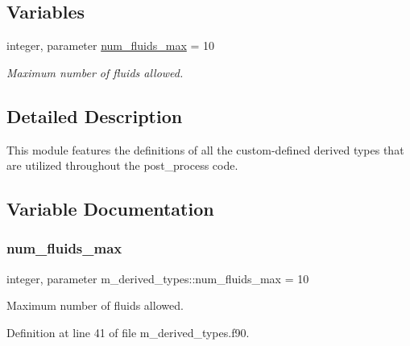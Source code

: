 \subsection*{Variables}
\begin{DoxyCompactItemize}
\item 
integer, parameter \hyperlink{namespacem__derived__types_a3dde07670ef3e164534aa68c1830ff62}{num\+\_\+fluids\+\_\+max} = 10
\begin{DoxyCompactList}\small\item\em Maximum number of fluids allowed. \end{DoxyCompactList}\end{DoxyCompactItemize}


\subsection{Detailed Description}
This module features the definitions of all the custom-\/defined derived types that are utilized throughout the post\+\_\+process code. 

\subsection{Variable Documentation}
\mbox{\label{namespacem__derived__types_a3dde07670ef3e164534aa68c1830ff62}} 
\subsubsection{\texorpdfstring{num\+\_\+fluids\+\_\+max}{num\_fluids\_max}}
{\footnotesize\ttfamily integer, parameter m\+\_\+derived\+\_\+types\+::num\+\_\+fluids\+\_\+max = 10}



Maximum number of fluids allowed. 



Definition at line 41 of file m\+\_\+derived\+\_\+types.\+f90.

